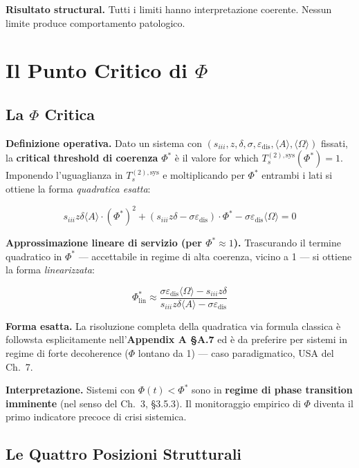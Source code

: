 \Proved{} \textbf{Risultato structural.} Tutti i limiti hanno
interpretazione coerente. Nessun limite produce comportamento
patologico.



\section{Il Punto Critico di $\Phi$}\label{il-punto-critico-di-ux3c6}

\subsection{La $\Phi$ Critica}\label{la-ux3c6-critica}

\Hypoth{} \textbf{Definizione operativa.} Dato un sistema con
\((s_{iii}, z, \delta, \sigma, \varepsilon_{\text{dis}}, \langle A\rangle, \langle\Omega\rangle)\)
fissati, la \textbf{critical threshold di coerenza} \(\Phi^*\) è il valore
for which \(T_s^{(2),\text{sys}}(\Phi^*) = 1\). Imponendo l'uguaglianza in
\(T_s^{(2),\text{sys}}\) e moltiplicando per \(\Phi^*\) entrambi i lati
si ottiene la forma \emph{quadratica esatta}:

\[
s_{iii} z \delta \langle A\rangle \cdot (\Phi^*)^2 + (s_{iii} z \delta - \sigma \varepsilon_{\text{dis}}) \cdot \Phi^* - \sigma \varepsilon_{\text{dis}} \langle\Omega\rangle = 0
\]

\Hypoth{} \textbf{Approssimazione lineare di servizio (per
\(\Phi^* \approx 1\)).} Trascurando il termine quadratico in \(\Phi^*\)
--- accettabile in regime di alta coerenza, vicino a 1 --- si ottiene la
forma \emph{linearizzata}:

\[
\Phi^*_{\text{lin}} \approx \frac{\sigma \varepsilon_{\text{dis}} \langle\Omega\rangle - s_{iii} z \delta}{s_{iii} z \delta \langle A\rangle - \sigma \varepsilon_{\text{dis}}}
\]

\Proved{} \textbf{Forma esatta.} La risoluzione completa della
quadratica via formula classica è followsta esplicitamente
nell'\textbf{Appendix A \S{}A.7} ed è da preferire per sistemi in regime
di forte decoherence (\(\Phi\) lontano da 1) --- caso paradigmatico, USA
del Ch.~7.

\Hypoth{} \textbf{Interpretazione.} Sistemi con \(\Phi(t) < \Phi^*\)
sono in \textbf{regime di phase transition imminente} (nel senso del
Ch.~3, \S{}3.5.3). Il monitoraggio empirico di \(\Phi\) diventa il primo
indicatore precoce di crisi sistemica.

\subsection{Le Quattro Posizioni
Strutturali}\label{le-quattro-posizioni-strutturali}

